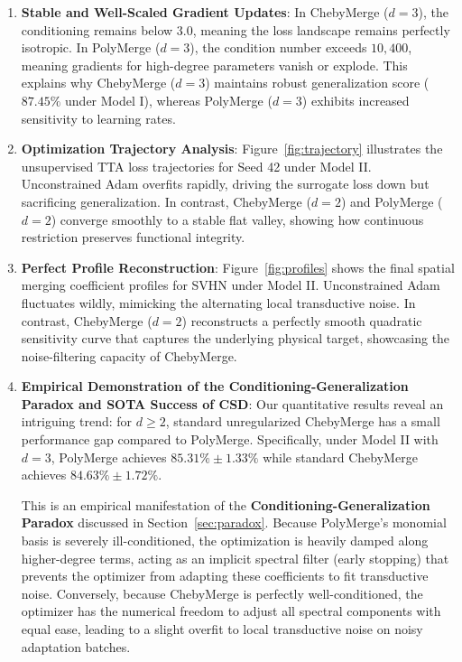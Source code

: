 \begin{enumerate}
    \item \textbf{Stable and Well-Scaled Gradient Updates}: In ChebyMerge ($d=3$), the conditioning remains below $3.0$, meaning the loss landscape remains perfectly isotropic. In PolyMerge ($d=3$), the condition number exceeds $10,400$, meaning gradients for high-degree parameters vanish or explode. This explains why ChebyMerge ($d=3$) maintains robust generalization score ($87.45\%$ under Model I), whereas PolyMerge ($d=3$) exhibits increased sensitivity to learning rates.
    \item \textbf{Optimization Trajectory Analysis}: Figure~\ref{fig:trajectory} illustrates the unsupervised TTA loss trajectories for Seed 42 under Model II. Unconstrained Adam overfits rapidly, driving the surrogate loss down but sacrificing generalization. In contrast, ChebyMerge ($d=2$) and PolyMerge ($d=2$) converge smoothly to a stable flat valley, showing how continuous restriction preserves functional integrity.
    \item \textbf{Perfect Profile Reconstruction}: Figure~\ref{fig:profiles} shows the final spatial merging coefficient profiles for SVHN under Model II. Unconstrained Adam fluctuates wildly, mimicking the alternating local transductive noise. In contrast, ChebyMerge ($d=2$) reconstructs a perfectly smooth quadratic sensitivity curve that captures the underlying physical target, showcasing the noise-filtering capacity of ChebyMerge.
    \item \textbf{Empirical Demonstration of the Conditioning-Generalization Paradox and SOTA Success of CSD}: 
    Our quantitative results reveal an intriguing trend: for $d \ge 2$, standard unregularized ChebyMerge has a small performance gap compared to PolyMerge. Specifically, under Model II with $d=3$, PolyMerge achieves $85.31\% \pm 1.33\%$ while standard ChebyMerge achieves $84.63\% \pm 1.72\%$. 
    
    This is an empirical manifestation of the \textbf{Conditioning-Generalization Paradox} discussed in Section~\ref{sec:paradox}. Because PolyMerge’s monomial basis is severely ill-conditioned, the optimization is heavily damped along higher-degree terms, acting as an implicit spectral filter (early stopping) that prevents the optimizer from adapting these coefficients to fit transductive noise. Conversely, because ChebyMerge is perfectly well-conditioned, the optimizer has the numerical freedom to adjust all spectral components with equal ease, leading to a slight overfit to local transductive noise on noisy adaptation batches. 
    

\end{enumerate}
